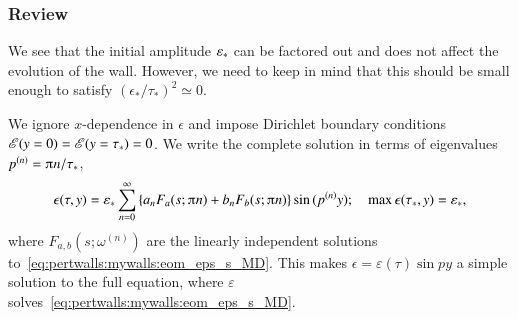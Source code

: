     
    


\subsubsection{Review}
    We see that the initial amplitude $\varepsilon_\ast$ can be factored out and does not affect the evolution of the wall. However, we need to keep in mind that this should be small enough to satisfy $(\epsilon_\ast/\tau_\ast)^2\simeq 0$. 

    We ignore $x$-dependence in $\epsilon$ and impose Dirichlet boundary conditions $\mathscr{E}(y=0)=\mathscr{E}(y=\tau_\ast)=0$. We write the complete solution in terms of eigenvalues $p^{(n)}= \ppi n/\tau_\ast$, 
    \begin{equation}
        \epsilon(\tau, y) = \epsast  \sum_{n=0}^{\infty} \cclosed{ a_n F_a(s; \ppi n ) + b_n F_b(s; \ppi n)} \sin{ (p^{(n)}y)}; \quad \max{\epsilon(\tau_\ast, y)} = \epsast,
    \end{equation}
    where $F_{a,b}(s; \omega^{(n)})$ are the linearly independent solutions to~\cref{eq:pertwalls:mywalls:eom_eps_s_MD}. This makes $\epsilon = \varepsilon(\tau)\sin{py}$ a simple solution to the full equation, where $\varepsilon$ solves~\cref{eq:pertwalls:mywalls:eom_eps_s_MD}. 







    
    

